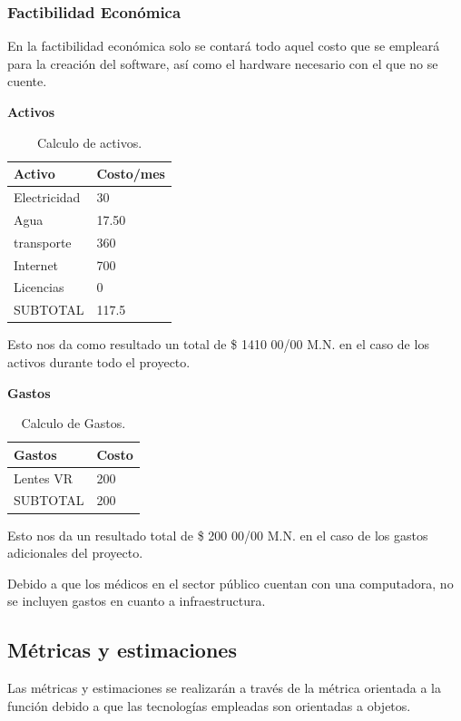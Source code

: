 \documentclass[10pt]{article}
\begin{document}
\subsubsection{Factibilidad Económica}

En la factibilidad económica solo se contará todo aquel costo que se empleará para la creación del software, así como el hardware necesario con el que no se cuente.

\textbf{Activos}

\begin{table}[htbp]
\begin{center}
\begin{tabular}{|p{4.2cm}|p{4.2cm}|}
\hline
Activo & Costo/mes  \\
\hline
Electricidad &  30 \\
\hline
Agua &  17.50 \\
\hline
transporte &  360 \\
\hline
Internet & 700\\
\hline
Licencias & 0\\
\hline
SUBTOTAL & 117.5\\
\hline
\end{tabular}
\caption{Calculo de activos.}
\label{tabla1}
\end{center}
\end{table}

Esto nos da como resultado un total de \$ 1410 00/00 M.N. en el caso de los activos durante todo el proyecto. 

\textbf{Gastos}

\begin{table}[htbp]
\begin{center}
\begin{tabular}{|p{4.2cm}|p{4.2cm}|}
\hline
Gastos & Costo\\
\hline
Lentes VR &  200 \\
\hline
SUBTOTAL & 200\\
\hline
\end{tabular}
\caption{Calculo de Gastos.}
\label{tabla1}
\end{center}
\end{table}

Esto nos da un resultado total de \$ 200 00/00 M.N. en el caso de los gastos adicionales del proyecto. 

Debido a que los médicos en el sector público cuentan con una computadora, no se incluyen gastos en cuanto a infraestructura.

\subsection{Métricas y estimaciones}
Las métricas y estimaciones se realizarán a través de la métrica orientada a la función debido a que las tecnologías empleadas son orientadas a objetos.
\end{document}
